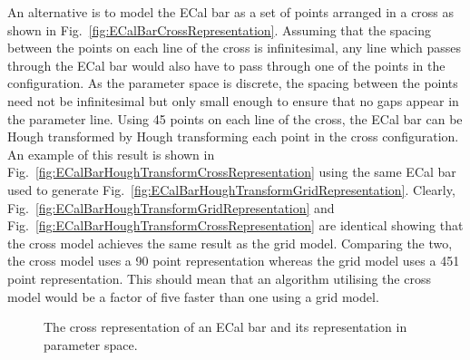 An alternative is to model the ECal bar as a set of points arranged in a cross as shown in Fig.~\ref{fig:ECalBarCrossRepresentation}.  Assuming that the spacing between the points on each line of the cross is infinitesimal, any line which passes through the ECal bar would also have to pass through one of the points in the configuration.  As the parameter space is discrete, the spacing between the points need not be infinitesimal but only small enough to ensure that no gaps appear in the parameter line.  Using 45 points on each line of the cross, the ECal bar can be Hough transformed by Hough transforming each point in the cross configuration. An example of this result is shown in Fig.~\ref{fig:ECalBarHoughTransformCrossRepresentation} using the same ECal bar used to generate Fig.~\ref{fig:ECalBarHoughTransformGridRepresentation}.  Clearly, Fig.~\ref{fig:ECalBarHoughTransformGridRepresentation} and Fig.~\ref{fig:ECalBarHoughTransformCrossRepresentation} are identical showing that the cross model achieves the same result as the grid model.  Comparing the two, the cross model uses a 90 point representation whereas the grid model uses a 451 point representation.  This should mean that an algorithm utilising the cross model would be a factor of five faster than one using a grid model.
\begin{figure}%
  \centering
  \caption{The cross representation of an ECal bar and its representation in parameter space.}
  \label{fig:ECalBarCrossRepresentationAndHoughTransform}
\end{figure}

